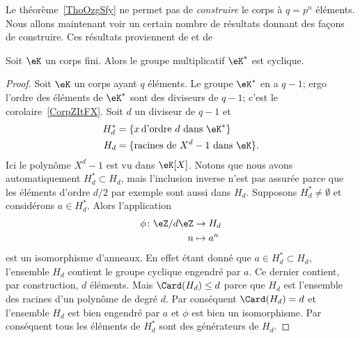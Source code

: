 Le théorème~\ref{ThoOzgSfy} ne permet pas de \emph{construire} le corps à \( q=p^n\) éléments. Nous allons maintenant voir un certain nombre de résultats donnant des façons de construire. Ces résultats proviennent de \cite{MichelMerlecorpsfinis,GabrielPeyre,RodierCorpsFinis} et de 

\begin{proposition}     \label{PropnfebjI}
    Soit \( \eK\) un corps fini. Alors le groupe multiplicatif \( \eK^*\) est cyclique.
\end{proposition}

\begin{proof}
    Soit \( \eK\) un corps ayant \( q\) éléments. Le groupe \( \eK^*\) en a \( q-1\); ergo l'ordre des éléments de \( \eK^*\) sont des diviseurs de \( q-1\); c'est le corolaire~\ref{CorpZItFX}. Soit \( d\) un diviseur de \( q-1\) et
    \begin{subequations}
        \begin{align}
            H^*_d&=\{ x\,\text{d'ordre } d\text{ dans } \eK^* \}\\
            H_d&=\{ \text{racines de } X^d-1\text{ dans } \eK \}.
        \end{align}
    \end{subequations}
    Ici le polynôme \( X^d-1\) est vu dans \( \eK[X]\). Notons que nous avons automatiquement \( H^*_d\subset H_d\), mais l'inclusion inverse n'est pas assurée parce que les éléments d'ordre \( d/2\) par exemple sont aussi dans \( H_d\). Supposons \( H^*_d\neq \emptyset\) et considérons \( a\in H^*_d\). Alors l'application
    \begin{equation}
        \begin{aligned}
            \phi\colon \eZ/d\eZ&\to H_d \\
            n&\mapsto a^n
        \end{aligned}
    \end{equation}
    est un isomorphisme d'anneaux. En effet étant donné que \( a\in H^*_d\subset H_d\), l'ensemble \( H_d\) contient le groupe cyclique engendré par \( a\). Ce dernier contient, par construction, \( d\) éléments. Mais \( \Card(H_d)\leq d\) parce que \( H_d\) est l'ensemble des racines d'un polynôme de degré \( d\). Par conséquent \( \Card(H_d)=d\) et l'ensemble \( H_d\) est bien engendré par \( a\) et \( \phi\) est bien un isomorphisme. Par conséquent tous les éléments de \( H^*_d\) sont des générateurs de \( H_d\).


\end{proof}

